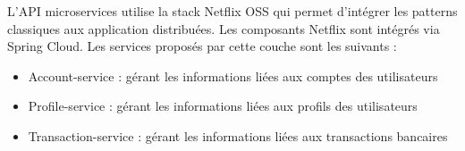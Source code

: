 	L'API microservices utilise la stack Netflix OSS qui permet d'intégrer les patterns classiques aux application distribuées. Les composants Netflix sont intégrés via Spring Cloud. Les services proposés par cette couche sont les suivants :\\

\begin{itemize}
			\item Account-service : gérant les informations liées aux comptes des utilisateurs
			\item Profile-service : gérant les informations liées aux profils des utilisateurs
			\item Transaction-service : gérant les informations liées aux transactions bancaires \\
\end{itemize}

